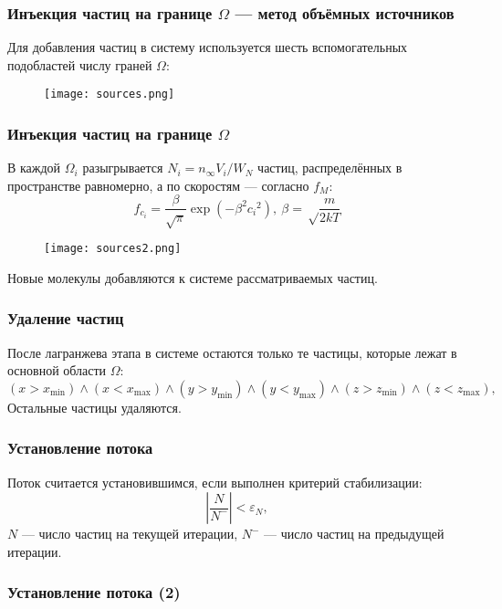 \documentclass[onlymath]{beamer}
\newcommand{\abs}[1]{\left \lvert{#1}\right \rvert}
\renewcommand\epsilon\varepsilon
\newcommand\dom{\Omega}
\newcommand\flowcon{n_{\infty}}
\begin{document}
\begin{frame}
  \frametitle{Инъекция частиц на границе $\dom$ — метод объёмных
    источников}
  Для добавления частиц в систему используется шесть вспомогательных
  подобластей числу граней $\dom$:
  \begin{figure}[!h]
    \centering
    \texttt{[image: sources.png]}
  \end{figure}    
\end{frame}

\begin{frame}
  \frametitle{Инъекция частиц на границе $\dom$}
  В каждой $\dom_i$ разыгрывается $N_i = \flowcon V_i / W_N$ частиц,
  распределённых в пространстве равномерно, а по скоростям — согласно
  $f_M$:
 \begin{equation*}
    f_{c_i} = \frac{\beta}{\sqrt{\pi}}\exp(-\beta^2{c_i}^2),\:  \beta = \sqrt\frac{m}{2kT}
  \end{equation*}
  \begin{figure}[!h]
    \centering
    \texttt{[image: sources2.png]}
  \end{figure}    
  Новые молекулы добавляются к системе рассматриваемых частиц.
\end{frame}

\begin{frame}
  \frametitle{Удаление частиц}
  После лагранжева этапа в системе остаются только те частицы, которые
  лежат в основной области $\dom$:
  \begin{equation*}
    (x > x_{\min}) \land (x < x_{\max}) \land (y > y_{\min}) \land
    (y < y_{\max}) \land (z > z_{\min}) \land (z < z_{\max}),
  \end{equation*}
  Остальные частицы удаляются.
\end{frame}

\begin{frame}
  \frametitle{Установление потока}
  Поток считается установившимся, если выполнен критерий
    стабилизации:
    \begin{equation*}
      \abs{\frac{N}{N^-}} < \epsilon_N,
    \end{equation*}
    $N$ — число частиц на текущей итерации, $N^-$ — число частиц на
    предыдущей итерации.
\end{frame}

\begin{frame}
  \frametitle{Установление потока (2)}
  \begin{figure}[!h]
  \end{figure}
\end{frame}
\end{document}
